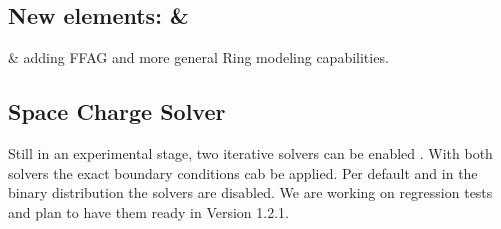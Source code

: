 \subsection{New elements:  \& }

  \&   adding FFAG and more general Ring modeling capabilities.

\subsection{Space Charge Solver}
Still in an experimental stage, two iterative solvers can be enabled . With both solvers the exact boundary conditions
cab be applied.  Per default and in the binary distribution the solvers are disabled. We are working on regression tests and plan to have them ready in Version 1.2.1.


